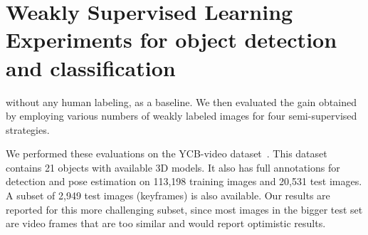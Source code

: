 \documentclass[letterpaper, 10 pt, conference]{ieeeconf}  %
\begin{document}
\section{Weakly Supervised Learning Experiments for object detection and classification}\label{sec:w_exp}%
without any human labeling, as a baseline. We then evaluated the gain obtained by employing various numbers of weakly labeled images for four semi-supervised strategies. %

We performed these evaluations on the YCB-video dataset~\cite{xiang2017posecnn}. This dataset contains 21 objects with available 3D models. It also has full annotations for detection and pose estimation on 113,198 training images and 20,531 test images. A subset of 2,949 test images (keyframes) is also available. Our results are reported for this more challenging subset, since most images in the bigger test set are video frames that are too similar and would report optimistic results.
\end{document}
